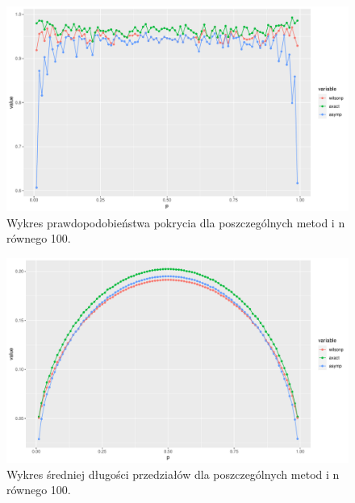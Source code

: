 \documentclass[12pt]{mwart}\usepackage[]{graphicx}\usepackage[]{color}
\makeatletter
\def\maxwidth{ %
  \ifdim\Gin@nat@width>\linewidth
    \linewidth
  \else
    \Gin@nat@width
  \fi
}
\newenvironment{knitrout}{}{} %
\makeatother
\begin{document}
\begin{knitrout}
\color{fgcolor}\begin{figure}[H]
\includegraphics[width=\maxwidth]{figure/fig_8-1} \caption{\label{fig:8}Wykres prawdopodobieństwa pokrycia dla poszczególnych metod i n równego 100.}\label{fig:fig_8}
\end{figure}

\end{knitrout}
\begin{knitrout}
\color{fgcolor}\begin{figure}[H]
\includegraphics[width=\maxwidth]{figure/fig_9-1} \caption{\label{fig:9}Wykres średniej długości przedziałów dla poszczególnych metod i n równego 100.}\label{fig:fig_9}
\end{figure}

\end{knitrout}
\end{document}

